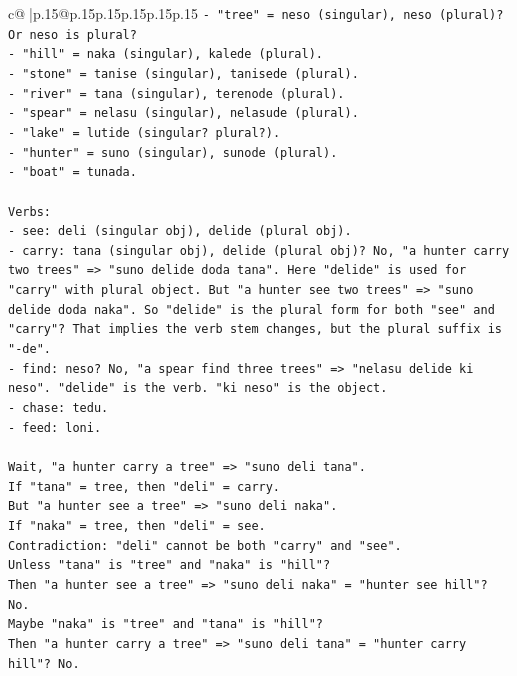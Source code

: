 \documentclass{article}
\begin{document}
{\begin{supertabular}{c@{$\;$}|p{.15\linewidth}@{}p{.15\linewidth}p{.15\linewidth}p{.15\linewidth}p{.15\linewidth}p{.15\linewidth}}
{{{\texttt{{-} "tree" = neso (singular), neso (plural)? Or neso is plural?} \\
\texttt{{-} "hill" = naka (singular), kalede (plural).} \\
\texttt{{-} "stone" = tanise (singular), tanisede (plural).} \\
\texttt{{-} "river" = tana (singular), terenode (plural).} \\
\texttt{{-} "spear" = nelasu (singular), nelasude (plural).} \\
\texttt{{-} "lake" = lutide (singular? plural?).} \\
\texttt{{-} "hunter" = suno (singular), sunode (plural).} \\
\texttt{{-} "boat" = tunada.} \\
\\ 
\texttt{Verbs:} \\
\texttt{{-} see: deli (singular obj), delide (plural obj).} \\
\texttt{{-} carry: tana (singular obj), delide (plural obj)? No, "a hunter carry two trees" => "suno delide doda tana". Here "delide" is used for "carry" with plural object. But "a hunter see two trees" => "suno delide doda naka". So "delide" is the plural form for both "see" and "carry"? That implies the verb stem changes, but the plural suffix is "{-}de".} \\
\texttt{{-} find: neso? No, "a spear find three trees" => "nelasu delide ki neso". "delide" is the verb. "ki neso" is the object.} \\
\texttt{{-} chase: tedu.} \\
\texttt{{-} feed: loni.} \\
\\ 
\texttt{Wait, "a hunter carry a tree" => "suno deli tana".} \\
\texttt{If "tana" = tree, then "deli" = carry.} \\
\texttt{But "a hunter see a tree" => "suno deli naka".} \\
\texttt{If "naka" = tree, then "deli" = see.} \\
\texttt{Contradiction: "deli" cannot be both "carry" and "see".} \\
\texttt{Unless "tana" is "tree" and "naka" is "hill"?} \\
\texttt{Then "a hunter see a tree" => "suno deli naka" = "hunter see hill"? No.} \\
\texttt{Maybe "naka" is "tree" and "tana" is "hill"?} \\
\texttt{Then "a hunter carry a tree" => "suno deli tana" = "hunter carry hill"? No.} \\
}}}
\end{supertabular}}
\end{document}
